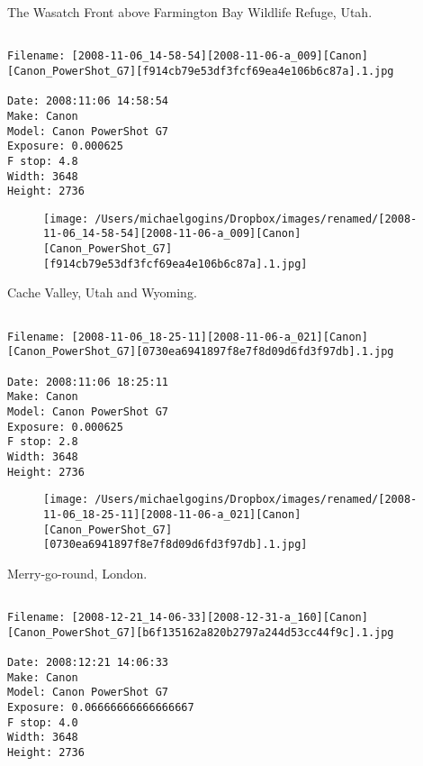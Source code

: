 \documentclass[11pt,letter,DIV=14,paper=landscape]{scrbook}
\begin{document}
\clearpage
\noindent The Wasatch Front above Farmington Bay Wildlife Refuge, Utah.
\noindent
\begin{lstlisting}

Filename: [2008-11-06_14-58-54][2008-11-06-a_009][Canon][Canon_PowerShot_G7][f914cb79e53df3fcf69ea4e106b6c87a].1.jpg

Date: 2008:11:06 14:58:54
Make: Canon
Model: Canon PowerShot G7
Exposure: 0.000625
F stop: 4.8
Width: 3648
Height: 2736
\end{lstlisting}
\clearpage

\begin{figure}
\texttt{[image: /Users/michaelgogins/Dropbox/images/renamed/[2008-11-06\_14-58-54][2008-11-06-a\_009][Canon][Canon\_PowerShot\_G7][f914cb79e53df3fcf69ea4e106b6c87a].1.jpg]}
\end{figure}
    
\clearpage
\noindent Cache Valley, Utah and Wyoming.
\noindent
\begin{lstlisting}

Filename: [2008-11-06_18-25-11][2008-11-06-a_021][Canon][Canon_PowerShot_G7][0730ea6941897f8e7f8d09d6fd3f97db].1.jpg

Date: 2008:11:06 18:25:11
Make: Canon
Model: Canon PowerShot G7
Exposure: 0.000625
F stop: 2.8
Width: 3648
Height: 2736
\end{lstlisting}
\clearpage

\begin{figure}
\texttt{[image: /Users/michaelgogins/Dropbox/images/renamed/[2008-11-06\_18-25-11][2008-11-06-a\_021][Canon][Canon\_PowerShot\_G7][0730ea6941897f8e7f8d09d6fd3f97db].1.jpg]}
\end{figure}
    
\clearpage
\noindent Merry-go-round, London.
\noindent
\begin{lstlisting}

Filename: [2008-12-21_14-06-33][2008-12-31-a_160][Canon][Canon_PowerShot_G7][b6f135162a820b2797a244d53cc44f9c].1.jpg

Date: 2008:12:21 14:06:33
Make: Canon
Model: Canon PowerShot G7
Exposure: 0.06666666666666667
F stop: 4.0
Width: 3648
Height: 2736
\end{lstlisting}
\clearpage
\end{document}
